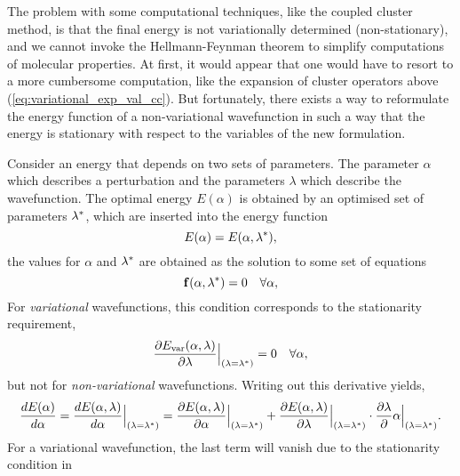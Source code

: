 The problem with some computational techniques, like the coupled cluster method,
is that the final energy is not variationally determined (non-stationary), 
and we cannot invoke the Hellmann-Feynman theorem to simplify computations of 
molecular properties. At first, it would appear that one would have to resort to 
a more cumbersome computation, like the expansion of cluster operators above 
(\autoref{eq:variational_exp_val_cc}). But fortunately, there exists a way to 
reformulate the energy function of a non-variational wavefunction in such a way that 
the energy is stationary with respect to the variables of the new formulation.

Consider an energy that depends on two sets of parameters. The parameter $\alpha$ which 
describes a perturbation and the parameters $\lambda$ which describe the wavefunction. 
The optimal energy $E(\alpha)$ is obtained by an optimised set of parameters $\vb{\lambda}^*$,
which are inserted into the energy function
\begin{equation}
    E(\alpha) = E(\alpha, \vb{\lambda}^*),
\end{equation}
the values for $\alpha$ and $\vb{\lambda}^*$ are obtained as the solution to some set of 
equations
\begin{equation}
    \label{eq:nonvar_cond_HellF}
    \vb{f}(\alpha, \vb{\lambda}^*) = 0 \quad \forall \alpha,
\end{equation}
For \emph{variational} wavefunctions, this condition corresponds to the stationarity requirement,
\begin{equation}
    \label{eq:stat_cond_HellF}
    \frac{\partial E_{\text{var}}(\alpha, \vb{\lambda})}
    {\partial \lambda}\Big\lvert_{(\vb{\lambda} = \vb{\lambda}^*)}
    = 0 \quad \forall \alpha,
\end{equation}
but not for \emph{non-variational} wavefunctions. Writing out this derivative yields,
\begin{equation}
\label{eq:total_derivative_HellF_energy}
\frac{dE(\alpha)}{d\alpha} 
= \frac{dE(\alpha, \vb{\lambda})}{d\alpha}\Big\lvert_{(\vb{\lambda} = \vb{\lambda}^*)}
= \frac{\partial E(\alpha, \vb{\lambda})}{\partial\alpha}\Big\lvert_{(\vb{\lambda} = \vb{\lambda}^*)}
+ \frac{\partial E(\alpha, \vb{\lambda})}{\partial\vb{\lambda}}\Big\lvert_{(\vb{\lambda} = \vb{\lambda}^*)}
\cdot
\frac{\partial \vb{\lambda}}{\partial}\alpha\Big\lvert_{(\vb{\lambda} = \vb{\lambda}^*)}.
\end{equation}
For a variational wavefunction, the last term will vanish due to the stationarity condition in 
